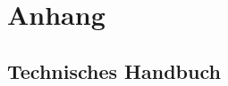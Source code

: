 \chapter{Anhang}\label{chap:anhang}

\section{Technisches Handbuch}\label{sec:technisches-handbuch}



